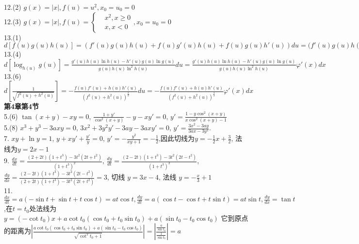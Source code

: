 \documentclass[12pt, a4paper, oneside]{ctexart}
\begin{document}
    12.(2) $g(x)=|x|,f(u)=u^2,x_0=u_0=0$\\
    12.(3) $g(x)=|x|,f(u)=\left\{\begin{aligned}&x^2,x\geq 0\\&x,x<0\end{aligned}\right.,x_0=u_0=0$\\
    13.(1) $d[f(u)g(u)h(u)]=(f'(u)g(u)h(u)+f(u)g'(u)h(u)+f(u)g(u)h'(u))du=(f'(u)g(u)h(u)+f(u)g'(u)h(u)+f(u)g(u)h'(u)\varphi'(x)dx$ \\
    13.(4) $d[\log_{h(u)}g(u)]=\frac{g'(u)h(u)\ln h(u)-h'(u)g(u)\ln g(u)}{g(u)h(u)\ln^2h(u)}du=\frac{g'(u)h(u)\ln h(u)-h'(u)g(u)\ln g(u)}{g(u)h(u)\ln^2h(u)}\varphi'(x)dx$\\
    13.(6) $d[\frac{1}{\sqrt{f^2(u)+h^2(u)}}]=-\frac{f(u)f'(u)+h(u)h'(u)}{(f^2(u)+h^2(u))^{\frac32}}du=-\frac{f(u)f'(u)+h(u)h'(u)}{(f^2(u)+h^2(u))^{\frac32}}\varphi'(x)dx$\\
    
    \textbf{第4章第4节}\\
    5.(6) $\tan(x+y)-xy=0$, $\frac{1+y'}{\cos^2(x+y)}-y-xy'=0$, $y'=\frac{1-y\cos^2(x+y)}{x\cos^2(x+y)-1}$\\
    5.(8) $x^3+y^3-3axy=0$, $3x^2+3y^2y'-3ay-3axy'=0$, $y'=\frac{3x^2-3ay}{3ax-3y^2}$.\\
    7. $xy+\ln y=1$, $y+xy'+\frac{y'}y=0$, $y'=-\frac{y^2}{xy+1}=-\frac12$,因此切线为$y=-\frac12x+\frac32$, 法线为$y=2x-1$\\
    9. $\frac{dx}{dt}=\frac{(2+2t)(1+t^3)-3t^2(2t+t^2)}{(1+t^3)^2}$, $\frac{dy}{dt}=\frac{(2-2t)(1+t^3)-3t^2(2t-t^2)}{(1+t^3)^2}$, $\frac{dy}{dx}=\frac{(2-2t)(1+t^3)-3t^2(2t-t^2)}{(2+2t)(1+t^3)-3t^2(2t+t^2)}=3$, 切线 $y=3x-4$, 法线 $y=-\frac x3+1$\\
    11. $\frac{dx}{dt}=a(-\sin t+\sin t+t\cos t)=at\cos t,\frac{dy}{dt}=a(\cos t-\cos t+t\sin t)=at\sin t, \frac{dy}{dx}=\tan t$,在$t=t_0$处法线为$y=(-\cot t_0)x+a\cot t_0(\cos t_0+t_0\sin t_0)+a(\sin t_0-t_0\cos t_0)$
    它到原点的距离为$|\frac{a\cot t_0(\cos t_0+t_0\sin t_0)+a(\sin t_0-t_0\cos t_0)}{\sqrt{\cot^2t_0+1}}|=|\frac{\frac{a}{\sin t_0}}{\frac1{\sin t_0}}|=a$\\
    
\end{document}
